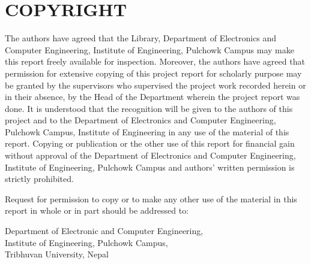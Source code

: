 \newpage
\section*{COPYRIGHT}
The authors have agreed that the Library, Department of Electronics and Computer Engineering, Institute of Engineering, Pulchowk
Campus may make this report freely available for inspection. Moreover, the authors have agreed that permission for extensive
copying of this project report for scholarly purpose may be granted by the supervisors who supervised the project work recorded 
herein or in their absence, by the Head of the Department wherein the project report was done. It is understood that the 
recognition will be given to the authors of this project and to the Department of Electronics and Computer Engineering, Pulchowk
Campus, Institute of Engineering in any use of the material of this report. Copying or publication or the other use of this report
for financial gain without approval of the Department of Electronics and Computer Engineering, Institute of Engineering, Pulchowk
Campus and authors' written permission is strictly prohibited.

Request for permission to copy or to make any other use of the material in this report in whole or in part should be 
addressed to:

Department of Electronic and Computer Engineering,\\
Institute of Engineering, Pulchowk Campus, \\ 
Tribhuvan University, Nepal 

